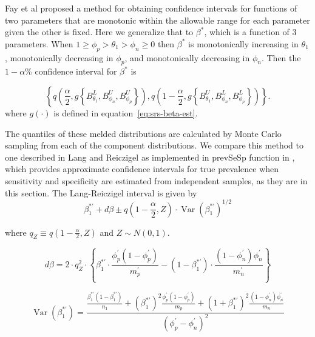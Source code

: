\documentclass[AMA,STIX1COL]{WileyNJD-v2}
\DeclareMathOperator{\Var}{Var}
\begin{document}
Fay et al \cite{FayP:2015} proposed a method for obtaining confidence intervals for functions of two parameters that are monotonic within the allowable range  for each parameter given the other is fixed. Here we generalize that to $\beta^*$, which is a function of 3 parameters. When $1 \geq \phi_p > \theta_1 > \phi_n \geq 0$ then $\beta^*$ is monotonically increasing in $\theta_1$, monotonically decreasing in $\phi_p$, and monotonically decreasing in $\phi_n$.
Then the \( 1-\alpha \)\% confidence interval for \( \beta^* \) is 

\begin{equation}
    \left\{ q \left( \frac{\alpha}{2}, g \left\{ B_{\theta_1}^L, B_{\phi_n}^U, B_{\phi_p}^U \right\}   \right),  
            q \left( 1 - \frac{\alpha}{2},  g \left\{ B_{\theta_1}^U, B_{\phi_n}^L, B_{\phi_p}^L \right\}   \right) \right\}.
\label{eq:srs-conf-int}
\end{equation}
where $g(\cdot)$ is defined in equation~\ref{eq:srs-beta-est}.


The quantiles of these melded distributions are calculated by Monte Carlo sampling from each of the component distributions.
We compare this method to one described in Lang and Reiczigel \cite{Lang:2014} as implemented in prevSeSp function in \cite{asht}, which provides approximate confidence intervals for true prevalence when sensitivity and specificity are estimated from independent samples, as they are  in this section.
The Lang-Reiczigel interval is given by
\begin{equation}
\beta_1^{*\prime} + d\beta \pm q\left( 1 - \frac{\alpha}{2}, Z \right) \cdot \Var(\beta_1^{*\prime})^{1/2}    
\end{equation}

where \( q_Z \equiv q\left( 1 - \frac{\alpha}{2}, Z \right)\) and \( Z \sim N(0,1) \).

\begin{equation}
    d\beta = 2 \cdot q_Z^2 \cdot\left\{ \beta_1^{*\prime} \cdot \frac{\phi_p^\prime (1 - \phi_p^\prime)}{m_p^\prime} - (1 - \beta_1^{*\prime}) \cdot \frac{(1 - \phi_n^\prime) \phi_n^\prime}{m_n^\prime}  \right\}
\end{equation}

\begin{equation}
    \Var(\beta_1^{*\prime}) = \frac{ \frac{\beta_1^{*\prime}(1 - \beta_1^{*\prime})}{n_1} + \left(\beta_1^{*\prime}\right)^2 \frac{\phi_p^\prime (1 - \phi_p^\prime)}{m_p} + \left(1 + \beta_1^{*\prime}\right)^2 \frac{(1 - \phi_n^\prime) \phi_n^\prime}{ m_n}}{(\phi_p^\prime - \phi_n^\prime)^2}
\end{equation}
\end{document}
